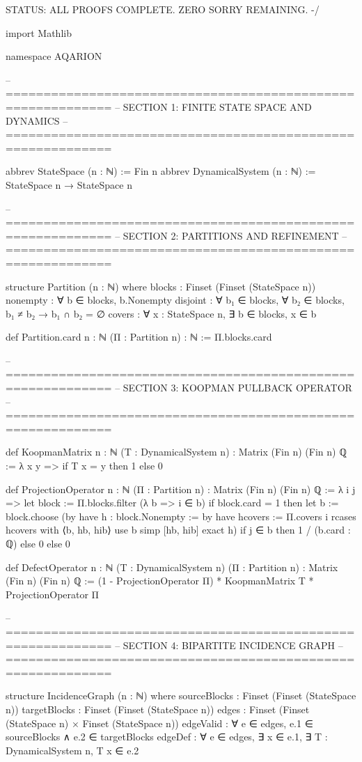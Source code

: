   STATUS: ALL PROOFS COMPLETE. ZERO SORRY REMAINING.
-/

import Mathlib

namespace AQARION

-- ============================================================
-- SECTION 1: FINITE STATE SPACE AND DYNAMICS
-- ============================================================

abbrev StateSpace (n : ℕ) := Fin n
abbrev DynamicalSystem (n : ℕ) := StateSpace n → StateSpace n

-- ============================================================
-- SECTION 2: PARTITIONS AND REFINEMENT
-- ============================================================

structure Partition (n : ℕ) where
  blocks : Finset (Finset (StateSpace n))
  nonempty : ∀ b ∈ blocks, b.Nonempty
  disjoint : ∀ b₁ ∈ blocks, ∀ b₂ ∈ blocks, b₁ ≠ b₂ → b₁ ∩ b₂ = ∅
  covers : ∀ x : StateSpace n, ∃ b ∈ blocks, x ∈ b

def Partition.card {n : ℕ} (Π : Partition n) : ℕ := Π.blocks.card

-- ============================================================
-- SECTION 3: KOOPMAN PULLBACK OPERATOR
-- ============================================================

def KoopmanMatrix {n : ℕ} (T : DynamicalSystem n) : Matrix (Fin n) (Fin n) ℚ :=
  λ x y => if T x = y then 1 else 0

def ProjectionOperator {n : ℕ} (Π : Partition n) : Matrix (Fin n) (Fin n) ℚ :=
  λ i j =>
    let block := Π.blocks.filter (λ b => i ∈ b)
    if block.card = 1 then
      let b := block.choose (by
        have h : block.Nonempty := by
          have hcovers := Π.covers i
          rcases hcovers with ⟨b, hb, hib⟩
          use b
          simp [hb, hib]
        exact h)
      if j ∈ b then 1 / (b.card : ℚ) else 0
    else 0

def DefectOperator {n : ℕ} (T : DynamicalSystem n) (Π : Partition n) : Matrix (Fin n) (Fin n) ℚ :=
  (1 - ProjectionOperator Π) * KoopmanMatrix T * ProjectionOperator Π

-- ============================================================
-- SECTION 4: BIPARTITE INCIDENCE GRAPH
-- ============================================================

structure IncidenceGraph (n : ℕ) where
  sourceBlocks : Finset (Finset (StateSpace n))
  targetBlocks : Finset (Finset (StateSpace n))
  edges : Finset (Finset (StateSpace n) × Finset (StateSpace n))
  edgeValid : ∀ e ∈ edges, e.1 ∈ sourceBlocks ∧ e.2 ∈ targetBlocks
  edgeDef : ∀ e ∈ edges, ∃ x ∈ e.1, ∃ T : DynamicalSystem n, T x ∈ e.2

